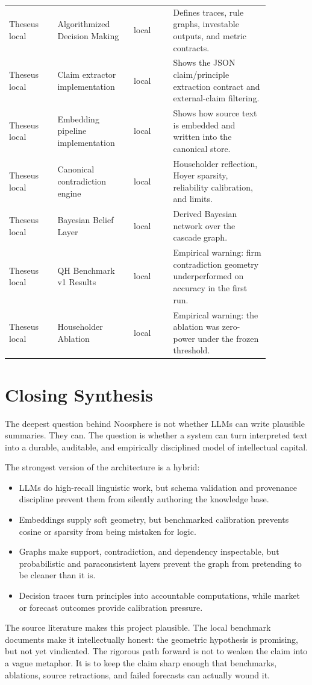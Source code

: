 \documentclass[11pt]{article}
\begin{document}
\begin{longtable}{p{0.16\linewidth}p{0.25\linewidth}p{0.13\linewidth}p{0.32\linewidth}}
Theseus local & Algorithmized Decision Making & local & Defines traces, rule graphs, investable outputs, and metric contracts. \\
Theseus local & Claim extractor implementation & local & Shows the JSON claim/principle extraction contract and external-claim filtering. \\
Theseus local & Embedding pipeline implementation & local & Shows how source text is embedded and written into the canonical store. \\
Theseus local & Canonical contradiction engine & local & Householder reflection, Hoyer sparsity, reliability calibration, and limits. \\
Theseus local & Bayesian Belief Layer & local & Derived Bayesian network over the cascade graph. \\
Theseus local & QH Benchmark v1 Results & local & Empirical warning: firm contradiction geometry underperformed on accuracy in the first run. \\
Theseus local & Householder Ablation & local & Empirical warning: the ablation was zero-power under the frozen threshold. \\
\bottomrule
\end{longtable}
\normalsize


\section{Closing Synthesis}

The deepest question behind Noosphere is not whether LLMs can write plausible
summaries. They can. The question is whether a system can turn interpreted text
into a durable, auditable, and empirically disciplined model of intellectual
capital.

The strongest version of the architecture is a hybrid:

\begin{itemize}
\item LLMs do high-recall linguistic work, but schema validation and provenance
discipline prevent them from silently authoring the knowledge base.
\item Embeddings supply soft geometry, but benchmarked calibration prevents
cosine or sparsity from being mistaken for logic.
\item Graphs make support, contradiction, and dependency inspectable, but
probabilistic and paraconsistent layers prevent the graph from pretending to be
cleaner than it is.
\item Decision traces turn principles into accountable computations, while
market or forecast outcomes provide calibration pressure.
\end{itemize}

The source literature makes this project plausible. The local benchmark
documents make it intellectually honest: the geometric hypothesis is promising,
but not yet vindicated. The rigorous path forward is not to weaken the claim
into a vague metaphor. It is to keep the claim sharp enough that benchmarks,
ablations, source retractions, and failed forecasts can actually wound it.
\end{document}
